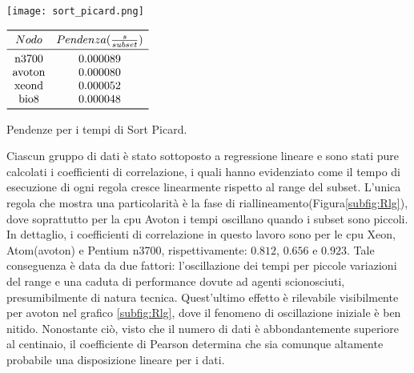 \begin{table}[H]
  \begin{minipage}[b]{0.4\linewidth}
	\centering
	\texttt{[image: sort\_picard.png]}
	\label{subfig:SP}
  \end{minipage}
  \hfill  
  \begin{varwidth}[b]{0.4\linewidth}
    \centering
    	$\begin{array}{*{2}{c}}
		\toprule
			Nodo & Pendenza(\frac{s}{subset})\\
		\midrule
			\text{n3700} &   0.000089 \\
			\text{avoton} &  0.000080 \\
			\text{xeond} &  0.000052 \\
			\text{bio8} &  0.000048 \\
		\bottomrule
	\end{array}$
    \caption{Pendenze per i tempi di Sort Picard.}
    \label{tab:Sp}
  \end{varwidth}%
\end{table}


Ciascun gruppo di dati è stato sottoposto a regressione lineare e sono stati pure calcolati i coefficienti di correlazione, i quali hanno evidenziato come il tempo di esecuzione di ogni regola cresce linearmente rispetto al range del subset.
L'unica regola che mostra una particolarità è la fase di riallineamento(Figura\ref{subfig:Rlg}), dove soprattutto per la cpu Avoton i tempi oscillano quando i subset sono piccoli. 
In dettaglio, i coefficienti di correlazione in questo lavoro sono per le cpu Xeon, Atom(avoton) e Pentium n3700, rispettivamente: $0.812$, $0.656$ e $0.923$. 
Tale conseguenza è data da due fattori: l'oscillazione dei tempi per piccole variazioni del range e una caduta di performance dovute ad agenti scionosciuti, presumibilmente di natura tecnica.
Quest'ultimo effetto è rilevabile visibilmente per avoton nel grafico \ref{subfig:Rlg}, dove il fenomeno di oscillazione iniziale è ben nitido.
Nonostante ciò, visto che il numero di dati è abbondantemente superiore al centinaio, il coefficiente di Pearson determina che sia comunque altamente probabile una disposizione lineare per i dati.





